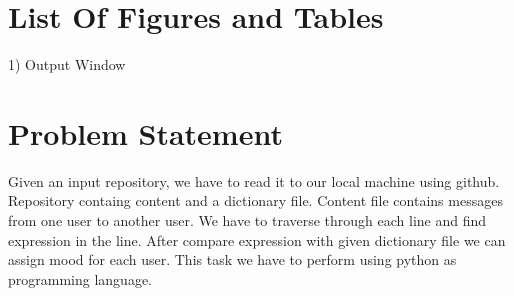 \documentclass[a4paper,12pt]{article}
\begin{document}
  \begin{center}
    \tableofcontents
    
  \end{center}
 
  \newpage
 \section{List Of Figures and Tables}
 \begin{small}
  1) Output Window
 \end{small}

    \section{Problem Statement}
  
  \begin{small}   
    
    Given an input repository, we have to read it to our local machine using github. Repository containg content and a dictionary file.
    Content file contains messages from one user to another user.
    We have to traverse through each line and find expression in the line.
    After compare expression with given dictionary file we can assign mood for each user.
    This task we have to perform using python as programming language.
     
    
    
    
    
    
  \end{small}
  
\end{document}
